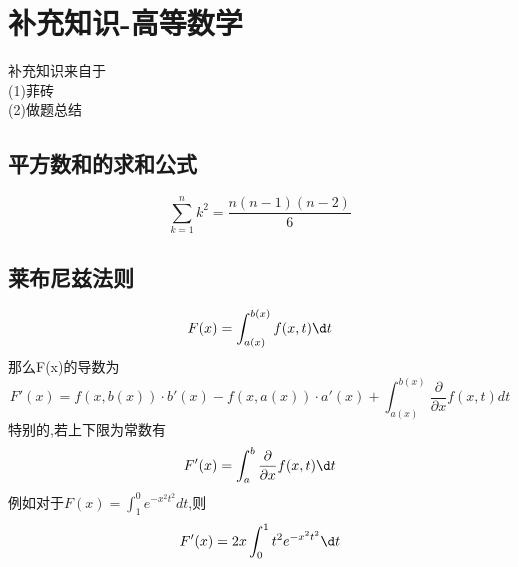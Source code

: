 \documentclass[12pt, a4paper, oneside, UTF8]{ctexbook}
\begin{document}

\else
\fi
\chapter {补充知识-高等数学}

\begin{tcolorbox}
    补充知识来自于 \\
    (1)菲砖 \\
    (2)做题总结
\end{tcolorbox}
\section{平方数和的求和公式}
\[
\sum_{k=1}^{n}k^2=\frac{n(n-1)(n-2)}{6}
\]
\section{莱布尼兹法则}
\[
F(x)=\int_{a(x)}^{b(x)}f(x,t)\d t 
\]
那么F(x)的导数为 
\[
F'(x) = f(x, b(x)) \cdot b'(x) - f(x, a(x)) \cdot a'(x) + \int_{a(x)}^{b(x)} \frac{\partial}{\partial x} f(x, t) dt
\]
特别的,若上下限为常数有 
\[
F'(x) = \int_{a}^{b}\frac{\partial}{\partial x}f(x,t)\d t
\]
例如对于$F(x)=\int_{1}^{0}e^{-x^2t^2}dt$,则 
\[
F'(x)=2x\int_{0}^{1}t^2e^{-x^2t^2}\d t
\]
\ifx\allfiles\undefined
\end{document}

